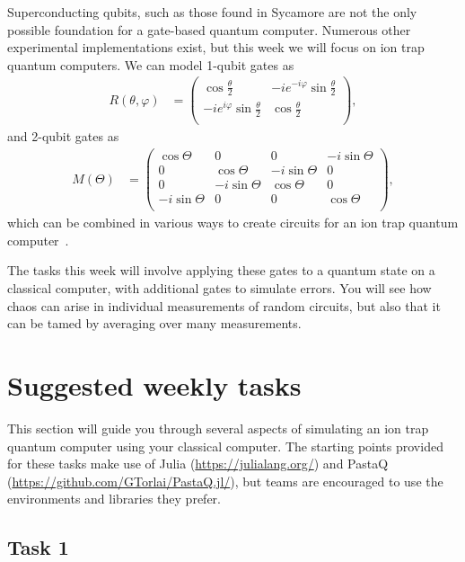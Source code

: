 \documentclass[12pt]{article}
\renewcommand{\phi}{\varphi}
\begin{document}
Superconducting qubits, such as those found in Sycamore are not the only possible foundation for a gate-based quantum computer.
Numerous other experimental implementations exist, but this week we will focus on ion trap quantum computers.
We can model 1-qubit gates as
\begin{align}
	R(\theta, \phi)
	&= \begin{pmatrix}
			\cos{\frac{\theta}{2}} & -i e^{-i \phi} \sin{\frac{\theta}{2}} \\
			-i e^{i \phi} \sin{\frac{\theta}{2}} & \cos{\frac{\theta}{2}} \\
		\end{pmatrix},
\end{align}
and 2-qubit gates as
\begin{align}
	M(\Theta)
	&= \begin{pmatrix}
			\cos{\Theta} & 0 & 0 & -i \sin{\Theta} \\
			0 & \cos{\Theta} & -i \sin{\Theta} & 0 \\
			0 & -i \sin{\Theta} & \cos{\Theta} & 0 \\
			-i \sin{\Theta} & 0 & 0 & \cos{\Theta} \\
		\end{pmatrix},
\end{align}
which can be combined in various ways to create circuits for an ion trap quantum computer~\cite{sorensen1999quantum,pogorelov2021compact}.

The tasks this week will involve applying these gates to a quantum state on a classical computer, with additional gates to simulate errors.
You will see how chaos can arise in individual measurements of random circuits, but also that it can be tamed by averaging over many measurements.


\section*{Suggested weekly tasks}

This section will guide you through several aspects of simulating an ion trap quantum computer using your classical computer.
The starting points provided for these tasks make use of Julia (\url{https://julialang.org/}) and PastaQ (\url{https://github.com/GTorlai/PastaQ.jl/}), but teams are encouraged to use the environments and libraries they prefer.


\subsection*{Task 1}
\end{document}
